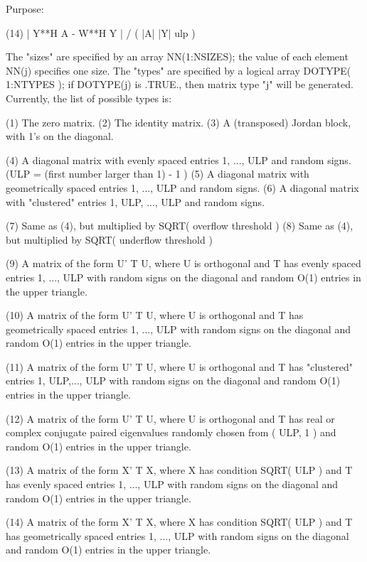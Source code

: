 \begin{DoxyParagraph}{Purpose\+: }
\begin{DoxyVerb}
    (14)    | Y**H A - W**H Y | / ( |A| |Y| ulp )

    The "sizes" are specified by an array NN(1:NSIZES); the value of
    each element NN(j) specifies one size.
    The "types" are specified by a logical array DOTYPE( 1:NTYPES );
    if DOTYPE(j) is .TRUE., then matrix type "j" will be generated.
    Currently, the list of possible types is:

    (1)  The zero matrix.
    (2)  The identity matrix.
    (3)  A (transposed) Jordan block, with 1's on the diagonal.

    (4)  A diagonal matrix with evenly spaced entries
         1, ..., ULP  and random signs.
         (ULP = (first number larger than 1) - 1 )
    (5)  A diagonal matrix with geometrically spaced entries
         1, ..., ULP  and random signs.
    (6)  A diagonal matrix with "clustered" entries 1, ULP, ..., ULP
         and random signs.

    (7)  Same as (4), but multiplied by SQRT( overflow threshold )
    (8)  Same as (4), but multiplied by SQRT( underflow threshold )

    (9)  A matrix of the form  U' T U, where U is orthogonal and
         T has evenly spaced entries 1, ..., ULP with random signs
         on the diagonal and random O(1) entries in the upper
         triangle.

    (10) A matrix of the form  U' T U, where U is orthogonal and
         T has geometrically spaced entries 1, ..., ULP with random
         signs on the diagonal and random O(1) entries in the upper
         triangle.

    (11) A matrix of the form  U' T U, where U is orthogonal and
         T has "clustered" entries 1, ULP,..., ULP with random
         signs on the diagonal and random O(1) entries in the upper
         triangle.

    (12) A matrix of the form  U' T U, where U is orthogonal and
         T has real or complex conjugate paired eigenvalues randomly
         chosen from ( ULP, 1 ) and random O(1) entries in the upper
         triangle.

    (13) A matrix of the form  X' T X, where X has condition
         SQRT( ULP ) and T has evenly spaced entries 1, ..., ULP
         with random signs on the diagonal and random O(1) entries
         in the upper triangle.

    (14) A matrix of the form  X' T X, where X has condition
         SQRT( ULP ) and T has geometrically spaced entries
         1, ..., ULP with random signs on the diagonal and random
         O(1) entries in the upper triangle.


\end{DoxyVerb}
\end{DoxyParagraph}
